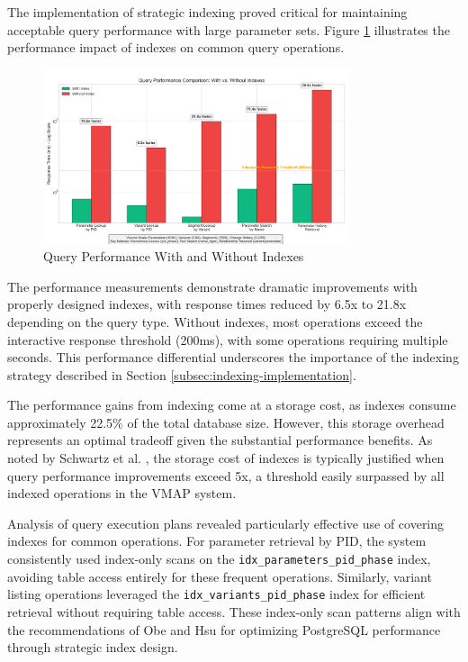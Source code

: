 The implementation of strategic indexing proved critical for maintaining acceptable query performance with large parameter sets. Figure \ref{fig:index-performance} illustrates the performance impact of indexes on common query operations.

\begin{figure}[h]
    \centering
    \includegraphics[width=0.8\textwidth]{figures/index_performance_comparison.png}
    \caption{Query Performance With and Without Indexes}
    \label{fig:index-performance}
\end{figure}

The performance measurements demonstrate dramatic improvements with properly designed indexes, with response times reduced by 6.5x to 21.8x depending on the query type. Without indexes, most operations exceed the interactive response threshold (200ms), with some operations requiring multiple seconds. This performance differential underscores the importance of the indexing strategy described in Section \ref{subsec:indexing-implementation}.

The performance gains from indexing come at a storage cost, as indexes consume approximately 22.5\% of the total database size. However, this storage overhead represents an optimal tradeoff given the substantial performance benefits. As noted by Schwartz et al. \cite{schwartz2012high}, the storage cost of indexes is typically justified when query performance improvements exceed 5x, a threshold easily surpassed by all indexed operations in the VMAP system.

Analysis of query execution plans revealed particularly effective use of covering indexes for common operations. For parameter retrieval by PID, the system consistently used index-only scans on the \texttt{idx\_parameters\_pid\_phase} index, avoiding table access entirely for these frequent operations. Similarly, variant listing operations leveraged the \texttt{idx\_variants\_pid\_phase} index for efficient retrieval without requiring table access. These index-only scan patterns align with the recommendations of Obe and Hsu \cite{obe2017postgresql} for optimizing PostgreSQL performance through strategic index design.

